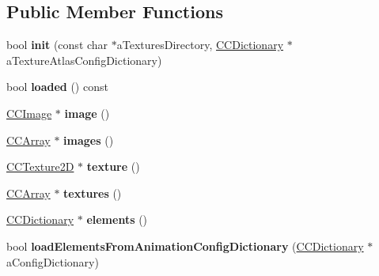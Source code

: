 \subsection*{Public Member Functions}
\begin{DoxyCompactItemize}
\item 
\hypertarget{class_g_a_f_1_1_g_a_f_texture_atlas_ad0e9c9b7d9ed9fedb4f77ec2f9a754f2}{bool {\bfseries init} (const char $\ast$a\-Textures\-Directory, \hyperlink{class_g_a_f_1_1_c_c_dictionary}{C\-C\-Dictionary} $\ast$a\-Texture\-Atlas\-Config\-Dictionary)}\label{class_g_a_f_1_1_g_a_f_texture_atlas_ad0e9c9b7d9ed9fedb4f77ec2f9a754f2}

\item 
\hypertarget{class_g_a_f_1_1_g_a_f_texture_atlas_ad079217d4bc03bfa5a1be2f23955d508}{bool {\bfseries loaded} () const }\label{class_g_a_f_1_1_g_a_f_texture_atlas_ad079217d4bc03bfa5a1be2f23955d508}

\item 
\hypertarget{class_g_a_f_1_1_g_a_f_texture_atlas_a1d4a6fa2bd1eef23417c46de6e92a1dc}{\hyperlink{class_g_a_f_1_1_c_c_image}{C\-C\-Image} $\ast$ {\bfseries image} ()}\label{class_g_a_f_1_1_g_a_f_texture_atlas_a1d4a6fa2bd1eef23417c46de6e92a1dc}

\item 
\hypertarget{class_g_a_f_1_1_g_a_f_texture_atlas_a1a5dccdaf8fa3721667d9dfecbbb5fba}{\hyperlink{class_g_a_f_1_1_c_c_array}{C\-C\-Array} $\ast$ {\bfseries images} ()}\label{class_g_a_f_1_1_g_a_f_texture_atlas_a1a5dccdaf8fa3721667d9dfecbbb5fba}

\item 
\hypertarget{class_g_a_f_1_1_g_a_f_texture_atlas_a23a8bb9096effdd4c298c488b4edc6a1}{\hyperlink{class_g_a_f_1_1_c_c_texture2_d}{C\-C\-Texture2\-D} $\ast$ {\bfseries texture} ()}\label{class_g_a_f_1_1_g_a_f_texture_atlas_a23a8bb9096effdd4c298c488b4edc6a1}

\item 
\hypertarget{class_g_a_f_1_1_g_a_f_texture_atlas_a6a2e81d603ea4cb5ccb28c70c3d2ac08}{\hyperlink{class_g_a_f_1_1_c_c_array}{C\-C\-Array} $\ast$ {\bfseries textures} ()}\label{class_g_a_f_1_1_g_a_f_texture_atlas_a6a2e81d603ea4cb5ccb28c70c3d2ac08}

\item 
\hypertarget{class_g_a_f_1_1_g_a_f_texture_atlas_a48e769c7aa5854840b3c076bdb1a7380}{\hyperlink{class_g_a_f_1_1_c_c_dictionary}{C\-C\-Dictionary} $\ast$ {\bfseries elements} ()}\label{class_g_a_f_1_1_g_a_f_texture_atlas_a48e769c7aa5854840b3c076bdb1a7380}

\item 
\hypertarget{class_g_a_f_1_1_g_a_f_texture_atlas_aee1e3f16c47352358e5f23258b23cc23}{bool {\bfseries load\-Elements\-From\-Animation\-Config\-Dictionary} (\hyperlink{class_g_a_f_1_1_c_c_dictionary}{C\-C\-Dictionary} $\ast$a\-Config\-Dictionary)}\label{class_g_a_f_1_1_g_a_f_texture_atlas_aee1e3f16c47352358e5f23258b23cc23}

\end{DoxyCompactItemize}

